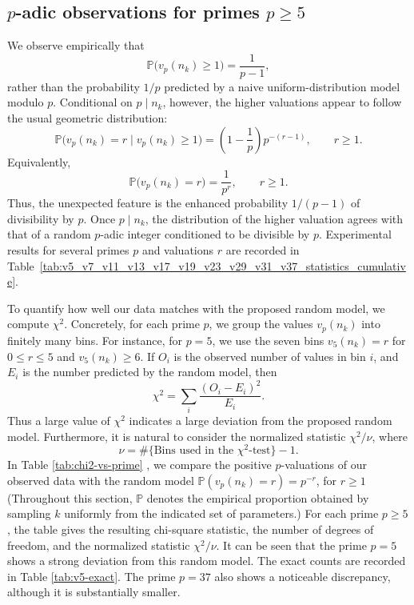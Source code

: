 \documentclass[12pt]{amsart}%
\newcommand{\1}{\mathds{1}}
\theoremstyle{definition}
\numberwithin{equation}{section}
\numberwithin{table}{section}
\numberwithin{figure}{section}
\begin{document}
\subsection{$p$-adic observations for primes $p \geq 5$}
\label{subsection:big_p-adic}

We observe empirically that
\[
\mathbb P\bigl(v_p(n_k)\geq 1\bigr)=\frac{1}{p-1},
\]
rather than the probability \(1/p\) predicted by a naive uniform-distribution model modulo \(p\). Conditional on \(p\mid n_k\), however, the higher valuations appear to follow the usual geometric distribution:
\[
\mathbb P\bigl(v_p(n_k)=r\mid v_p(n_k)\geq 1\bigr)
=
\left(1-\frac{1}{p}\right)p^{-(r-1)},
\qquad r\geq 1.
\]
Equivalently,
\[
\mathbb P\bigl(v_p(n_k)=r\bigr)=\frac{1}{p^r},
\qquad r\geq 1.
\]
Thus, the unexpected feature is the enhanced probability \(1/(p-1)\) of divisibility by \(p\). Once \(p\mid n_k\), the distribution of the higher valuation agrees with that of a random \(p\)-adic integer conditioned to be divisible by \(p\). Experimental results for several primes \(p\) and valuations \(r\) are recorded in Table~\ref{tab:v5_v7_v11_v13_v17_v19_v23_v29_v31_v37_statistics_cumulative}.

To quantify how well our data matches with the proposed random model, we compute $\chi^2$. Concretely, for each prime $p$, we group the values $v_p(n_k)$ into finitely many bins. For instance, for $p = 5$, we use the seven bins $v_5(n_k) = r$ for $0 \leq r \leq 5$ and $v_5(n_k) \geq 6$. If $O_i$ is the observed number of values in bin $i$, and $E_i$ is the number predicted by the random model, then
\[
\chi^2=\sum_i \frac{(O_i-E_i)^2}{E_i}.
\]
Thus a large value of $\chi^2$ indicates a large deviation from the proposed random model. Furthermore, it is natural to consider the normalized statistic $\chi^2/\nu$,%
where
\[
\nu = \#\{\text{Bins used in the $\chi^2$-test}\} -1.
\]
In Table \ref{tab:chi2-vs-prime} , we compare the positive $p$-valuations of our observed data with the random model $\mathbb{P} (v_p(n_k) = r) = p^{-r}$, for $r \geq 1$ (Throughout this section, $\mathbb P$ denotes the empirical proportion obtained
by sampling $k$ uniformly from the indicated set of parameters.)%
For each prime $p \geq 5$, the table gives the resulting chi-square statistic, the number of degrees of freedom, and the normalized statistic $\chi^2/\nu$. It can be seen that the prime $p = 5$ shows a strong deviation from this random model.
The exact counts are recorded in Table \ref{tab:v5-exact}. The prime $p=37$ also shows a
noticeable discrepancy, although it is substantially smaller.
\end{document}
